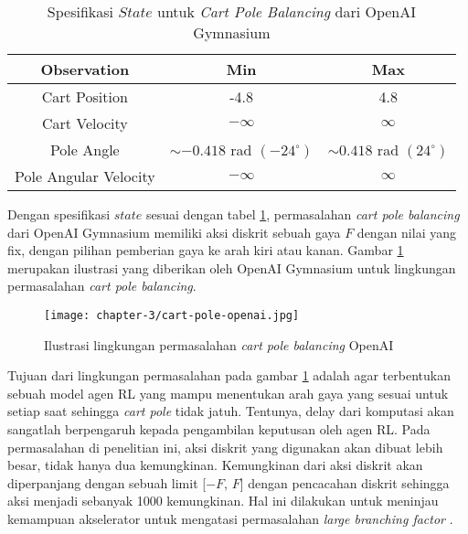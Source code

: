 \begin{table}[h!]
	\caption{Spesifikasi $State$ untuk \textit{Cart Pole Balancing} dari OpenAI Gymnasium}
	\label{tab:state-space-cart-pole}
	\centering
	\begin{tabular}{|c|c|c|}
		\hline
		Observation           & Min                             & Max                           \\
		\hline
		Cart Position         & -4.8                            & 4.8                           \\
		\hline
		Cart Velocity         & $-\infty$                       & $\infty$                      \\
		\hline
		Pole Angle            & $\sim -0.418$ rad $(-24^\circ)$ & $\sim 0.418$ rad $(24^\circ)$ \\
		\hline
		Pole Angular Velocity & $-\infty$                       & $\infty$                      \\
		\hline
	\end{tabular}
\end{table}

Dengan spesifikasi $state$ sesuai dengan tabel \ref{tab:state-space-cart-pole}, permasalahan \textit{cart pole balancing} dari OpenAI Gymnasium memiliki aksi diskrit sebuah gaya $F$ dengan nilai yang fix, dengan pilihan pemberian gaya ke arah kiri atau kanan. Gambar \ref{fig:cartpole-openai} merupakan ilustrasi yang diberikan oleh OpenAI Gymnasium untuk lingkungan permasalahan \textit{cart pole balancing}.

\begin{figure}[h]
	\centering
	\texttt{[image: chapter-3/cart-pole-openai.jpg]}
	\caption{Ilustrasi lingkungan permasalahan \textit{cart pole balancing} OpenAI}
	\label{fig:cartpole-openai}
\end{figure}

Tujuan dari lingkungan permasalahan pada gambar \ref{fig:cartpole-openai} adalah agar terbentukan sebuah model agen \ac{RL} yang mampu menentukan arah gaya yang sesuai untuk setiap saat sehingga \textit{cart pole} tidak jatuh. Tentunya, delay dari komputasi akan sangatlah berpengaruh kepada pengambilan keputusan oleh agen \ac{RL}. Pada permasalahan di penelitian ini, aksi diskrit yang digunakan akan dibuat lebih besar, tidak hanya dua kemungkinan. Kemungkinan dari aksi diskrit akan diperpanjang dengan sebuah limit [$-F$, $F$] dengan pencacahan diskrit sehingga aksi menjadi sebanyak 1000 kemungkinan. Hal ini dilakukan untuk meninjau kemampuan akselerator untuk mengatasi permasalahan \textit{large branching factor} \parencite{amado2018qtable}.






% 
% 
% 
% 
% 
% 
% 
